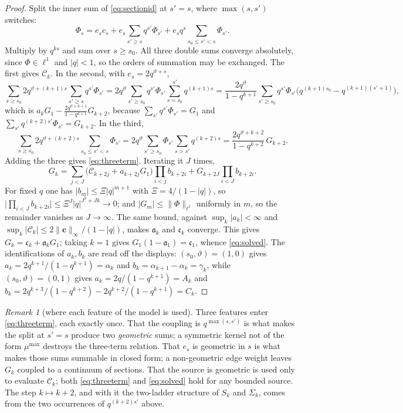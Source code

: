 \documentclass[11pt]{article}
\theoremstyle{plain}
\theoremstyle{definition}
\theoremstyle{remark}
\newtheorem{remark}[theorem]{Remark}
\begin{document}
\begin{proof}
Split the inner sum of \eqref{eq:sectionid} at $s'=s$, where $\max(s,s')$ switches:
\[
  \Phi_s=e_sc_s+e_s\!\!\sum_{s'\ge s}\!q^{s'}\Phi_{s'}+e_sq^{s}\!\!\sum_{s_0\le s'<s}\!\Phi_{s'} .
\]
Multiply by $q^{ks}$ and sum over $s\ge s_0$. All three double sums converge absolutely, since
$\Phi\in\ell^1$ and $|q|<1$, so the orders of summation may be exchanged. The first gives
$\mathcal C_k$. In the second, with $e_s=2q^{\vartheta+s}$,
\[
  \sum_{s\ge s_0}2q^{\vartheta+(k+1)s}\sum_{s'\ge s}q^{s'}\Phi_{s'}
  =2q^{\vartheta}\sum_{s'\ge s_0}q^{s'}\Phi_{s'}\sum_{s=s_0}^{s'}q^{(k+1)s}
  =\frac{2q^{\vartheta}}{1-q^{k+1}}\sum_{s'\ge s_0}q^{s'}\Phi_{s'}
      \bigl(q^{(k+1)s_0}-q^{(k+1)(s'+1)}\bigr),
\]
which is $a_kG_1-\frac{2q^{\vartheta+k+1}}{1-q^{k+1}}G_{k+2}$, because
$\sum_{s'}q^{s'}\Phi_{s'}=G_1$ and $\sum_{s'}q^{(k+2)s'}\Phi_{s'}=G_{k+2}$. In the third,
\[
  \sum_{s\ge s_0}2q^{\vartheta+(k+2)s}\sum_{s_0\le s'<s}\Phi_{s'}
  =2q^{\vartheta}\sum_{s'\ge s_0}\Phi_{s'}\sum_{s>s'}q^{(k+2)s}
  =\frac{2q^{\vartheta+k+2}}{1-q^{k+2}}\,G_{k+2}.
\]
Adding the three gives \eqref{eq:threeterm}. Iterating it $J$ times,
\[
  G_k=\sum_{j<J}\bigl(\mathcal C_{k+2j}+a_{k+2j}G_1\bigr)\prod_{i<j}b_{k+2i}
      +G_{k+2J}\prod_{i<J}b_{k+2i}.
\]
For fixed $q$ one has $|b_m|\le\Xi|q|^{m+1}$ with $\Xi=4/(1-|q|)$, so
$\bigl|\prod_{i<J}b_{k+2i}\bigr|\le\Xi^{J}|q|^{J^2+Jk}\to0$; and $|G_m|\le\|\Phi\|_{\ell^1}$
uniformly in $m$, so the remainder vanishes as $J\to\infty$. The same bound, against
$\sup_k|a_k|<\infty$ and $\sup_k|\mathcal C_k|\le2\|\mathbf c\|_\infty/(1-|q|)$, makes
$\mathfrak a_k$ and $\mathfrak c_k$ converge. This gives $G_k=\mathfrak c_k+\mathfrak a_kG_1$;
taking $k=1$ gives $G_1(1-\mathfrak a_1)=\mathfrak c_1$, whence \eqref{eq:solved}. The
identifications of $a_k,b_k$ are read off the displays: $(s_0,\vartheta)=(1,0)$ gives
$a_k=2q^{k+1}/(1-q^{k+1})=\alpha_k$ and $b_k=\alpha_{k+1}-\alpha_k=\gamma_k$, while
$(s_0,\vartheta)=(0,1)$ gives $a_k=2q/(1-q^{k+1})=A_k$ and
$b_k=2q^{k+3}/(1-q^{k+2})-2q^{k+2}/(1-q^{k+1})=C_k$.
\end{proof}

\begin{remark}[where each feature of the model is used]\label{rem:telhyp}
Three features enter \eqref{eq:threeterm}, each exactly once. That the coupling is
$q^{\max(s,s')}$ is what makes the split at $s'=s$ produce two \emph{geometric} sums; a symmetric
kernel not of the form $\mu^{\max}$ destroys the three-term relation. That $e_s$ is geometric in
$s$ is what makes those sums summable in closed form; a non-geometric edge weight leaves $G_k$
coupled to a continuum of sections. That the source is geometric is used only to evaluate
$\mathcal C_k$; both \eqref{eq:threeterm} and \eqref{eq:solved} hold for any bounded source. The
step $k\mapsto k+2$, and with it the two-ladder structure of $S_k$ and $\Sigma_k$, comes from the
two occurrences of $q^{(k+2)s'}$ above.
\end{remark}
\end{document}

